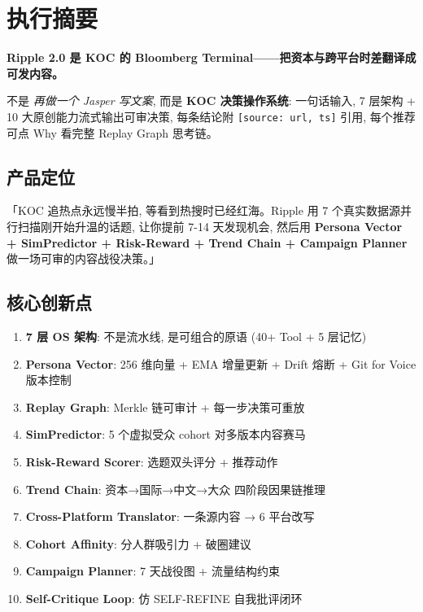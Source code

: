 \section*{执行摘要}

\begin{insight}
\textbf{Ripple 2.0 是 KOC 的 Bloomberg Terminal——把资本与跨平台时差翻译成可发内容。}

不是 \textit{再做一个 Jasper 写文案}, 而是\textbf{ KOC 决策操作系统}: 一句话输入, 7 层架构 + 10 大原创能力流式输出可审决策, 每条结论附 \texttt{[source: url, ts]} 引用, 每个推荐可点 Why 看完整 Replay Graph 思考链。
\end{insight}

\subsection*{产品定位}

「KOC 追热点永远慢半拍, 等看到热搜时已经红海。Ripple 用 7 个真实数据源并行扫描刚开始升温的话题, 让你提前 7-14 天发现机会, 然后用 \textbf{Persona Vector + SimPredictor + Risk-Reward + Trend Chain + Campaign Planner} 做一场可审的内容战役决策。」

\subsection*{核心创新点}

\begin{enumerate}
    \item \textbf{7 层 OS 架构}: 不是流水线, 是可组合的原语 (40+ Tool + 5 层记忆)
    \item \textbf{Persona Vector}: 256 维向量 + EMA 增量更新 + Drift 熔断 + Git for Voice 版本控制
    \item \textbf{Replay Graph}: Merkle 链可审计 + 每一步决策可重放
    \item \textbf{SimPredictor}: 5 个虚拟受众 cohort 对多版本内容赛马
    \item \textbf{Risk-Reward Scorer}: 选题双头评分 + 推荐动作
    \item \textbf{Trend Chain}: 资本→国际→中文→大众 四阶段因果链推理
    \item \textbf{Cross-Platform Translator}: 一条源内容 → 6 平台改写
    \item \textbf{Cohort Affinity}: 分人群吸引力 + 破圈建议
    \item \textbf{Campaign Planner}: 7 天战役图 + 流量结构约束
    \item \textbf{Self-Critique Loop}: 仿 SELF-REFINE 自我批评闭环
\end{enumerate}

